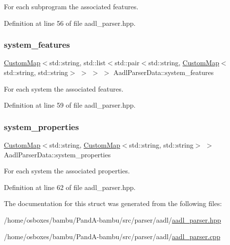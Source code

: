 For each subprogram the associated features. 



Definition at line 56 of file aadl\+\_\+parser.\+hpp.

\mbox{\label{structAadlParserData_aa8803edaa9b3f270b5ed4d3a8038aa98}} 
\subsubsection{\texorpdfstring{system\+\_\+features}{system\_features}}
{\footnotesize\ttfamily \hyperlink{custom__map_8hpp_a18ca01763abbe3e5623223bfe5aaac6b}{Custom\+Map}$<$std\+::string, std\+::list$<$std\+::pair$<$std\+::string, \hyperlink{custom__map_8hpp_a18ca01763abbe3e5623223bfe5aaac6b}{Custom\+Map}$<$std\+::string, std\+::string$>$ $>$ $>$ $>$ Aadl\+Parser\+Data\+::system\+\_\+features}



For each system the associated features. 



Definition at line 59 of file aadl\+\_\+parser.\+hpp.

\mbox{\label{structAadlParserData_a369138a227b82faab1eeacde070120be}} 
\subsubsection{\texorpdfstring{system\+\_\+properties}{system\_properties}}
{\footnotesize\ttfamily \hyperlink{custom__map_8hpp_a18ca01763abbe3e5623223bfe5aaac6b}{Custom\+Map}$<$std\+::string, \hyperlink{custom__map_8hpp_a18ca01763abbe3e5623223bfe5aaac6b}{Custom\+Map}$<$std\+::string, std\+::string$>$ $>$ Aadl\+Parser\+Data\+::system\+\_\+properties}



For each system the associated properties. 



Definition at line 62 of file aadl\+\_\+parser.\+hpp.



The documentation for this struct was generated from the following files\+:\begin{DoxyCompactItemize}
\item 
/home/osboxes/bambu/\+Pand\+A-\/bambu/src/parser/aadl/\hyperlink{aadl__parser_8hpp}{aadl\+\_\+parser.\+hpp}\item 
/home/osboxes/bambu/\+Pand\+A-\/bambu/src/parser/aadl/\hyperlink{aadl__parser_8cpp}{aadl\+\_\+parser.\+cpp}\end{DoxyCompactItemize}
